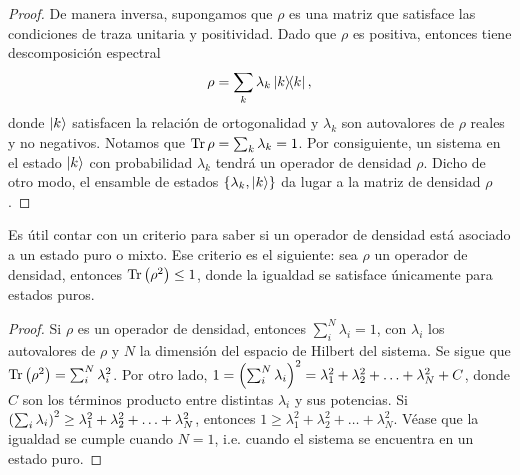 \begin{proof}
 	De manera inversa,
 	supongamos que $\rho$ es una matriz que satisface las condiciones
	de traza unitaria y positividad. Dado que $\rho$ es positiva, entonces
	tiene descomposición espectral \cite{nielsen_chuang_2011} 
	 
	\begin{align*}
		\rho = \sum _k \lambda _k \dyad{k}{k},
	\end{align*}
	donde $\ket{k}$ satisfacen la relación de ortogonalidad y $\lambda _k$ son
	autovalores de $\rho$ reales y no negativos. Notamos que $\Tr \rho = \sum _k
	\lambda _k = 1$. Por consiguiente, un sistema en el estado $\ket{k}$ con 
	probabilidad $\lambda_k$ tendrá un operador de densidad $\rho$. Dicho 
	de otro modo, el ensamble de estados $\{ \lambda_k,\ket{k}\}$ 
	da lugar a la matriz de densidad $\rho$. 
\end{proof}

Es útil contar con un criterio para saber si un operador de densidad 
está asociado a un estado puro o mixto. Ese criterio es el siguiente:
sea $\rho$ un operador de densidad, entonces
$\Tr \qty(\rho^2)\leq 1$, donde la igualdad se satisface únicamente
para estados puros.

\begin{proof}
	Si $\rho$ es un operador de densidad, entonces $\sum_i^N \lambda_i=1$, 
	con $\lambda_i$ los autovalores de $\rho$ y $N$ la dimensión 
	del espacio de Hilbert del sistema. Se sigue que 
	$\Tr \qty(\rho^2) = \sum_i^N \lambda_i^2$. Por otro lado, 
	$1=\qty(\sum_i^N \lambda_i)^2=\lambda_1^2+\lambda_2^2+\ldots+\lambda_N^2+C$,
	donde $C$ son los términos producto entre distintas $\lambda_i$ y sus
	potencias. Si 
	$\qty(\sum_i \lambda_i)^2\geq\lambda_1^2+\lambda_2^2+\ldots+\lambda_N^2$,
	entonces
	$1\geq\lambda_1^2+\lambda_2^2+\ldots+\lambda_N^2$. Véase que 
	la igualdad se cumple cuando $N=1$, i.e. cuando el sistema 
	se encuentra en un estado puro. 
\end{proof}

